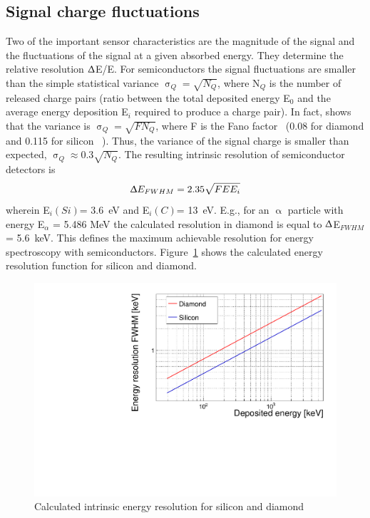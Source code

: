 \documentclass[twoside,12pt]{packages/mytustyle}  %
\begin{document}
\subsection{Signal charge fluctuations}
Two of the important sensor characteristics are the magnitude of the signal and the fluctuations of the signal at a given absorbed energy. They determine the relative resolution $\Updelta$E/E. For semiconductors the signal fluctuations are smaller than the simple statistical variance $\upsigma_Q=\sqrt{N_Q}$, where N$_Q$ is the number of released charge pairs (ratio between the total deposited energy E$_0$ and the average energy deposition E$_i$ required to produce a charge pair). In fact, \cite{} shows that the variance is $\upsigma_Q=\sqrt{F N_Q}$, where F is the Fano factor~\cite{} (0.08 for diamond and 0.115 for silicon ~\cite{}). Thus, the variance of the signal charge is smaller than expected, $\upsigma_Q\approx0.3 \sqrt{N_Q}$. The resulting intrinsic resolution of semiconductor detectors is 
\begin{equation}
\label{eq:efwhm}
\Updelta E_{FWHM} = 2.35 \sqrt{FEE_i} 
\end{equation} 
wherein E$_i(Si)$= 3.6~eV and E$_i(C)$= 13~eV. E.g., for an $\upalpha$ particle with energy E$_\alpha$ = 5.486 MeV the calculated resolution in diamond is equal to $\Updelta$E$_{FWHM}$ = 5.6~keV. This defines the maximum achievable resolution for energy spectroscopy with semiconductors. Figure~\ref{fig:enerres} shows the calculated energy resolution function for silicon and diamond.

\begin{figure}[!t]
\begin{center}
\includegraphics[width=0.45\linewidth]{../../scripts/02_pulse_formation/plots/resolution}
\caption{Calculated intrinsic energy resolution for silicon and diamond}
\label{fig:enerres}
\end{center}
\end{figure}




\clearpage
\end{document}
